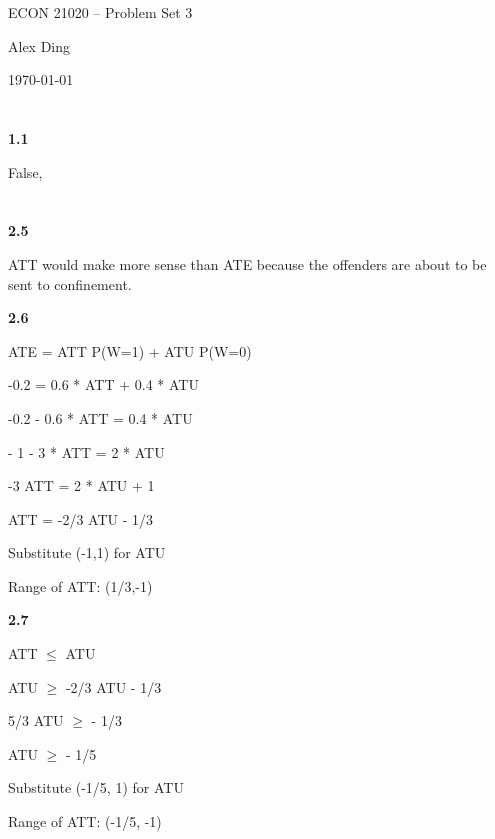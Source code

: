 



{\LARGE \centering ECON 21020 -- Problem Set 3\par}
{\vspace{-1em} \large \centering Alex Ding \par}
{\centering \vspace{-1em} \today \par }


\section{}

\textbf{1.1}

False,

\section{}

\textbf{2.5}

ATT would make more sense than ATE because the offenders are about to be sent to confinement.

\textbf{2.6}

ATE = ATT P(W=1) + ATU P(W=0)

-0.2 = 0.6 * ATT + 0.4 * ATU

-0.2 - 0.6 * ATT = 0.4 * ATU

- 1 - 3 * ATT = 2 * ATU

-3 ATT = 2 * ATU + 1

ATT = -2/3 ATU - 1/3

Substitute (-1,1) for ATU

Range of ATT: (1/3,-1)

\textbf{2.7}

ATT $\leq$ ATU

ATU $\geq$ -2/3 ATU - 1/3

5/3 ATU $\geq$ - 1/3

ATU $\geq$ - 1/5

Substitute (-1/5, 1) for ATU

Range of ATT: (-1/5, -1)

\newpage
\section{}

